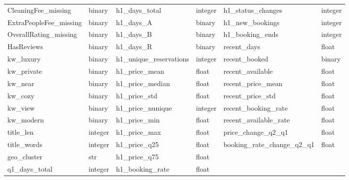 \documentclass[journal]{IEEEtran}
\begin{document}
\begin{table}[!ht]
\begin{tabular}{ll|ll|ll}
CleaningFee\_missing & binary & h1\_days\_total & integer & h1\_status\_changes & integer \\
ExtraPeopleFee\_missing & binary & h1\_days\_A & binary & h1\_new\_bookings & integer \\
OverallRating\_missing & binary & h1\_days\_B & binary & h1\_booking\_ends & integer \\
HasReviews & binary & h1\_days\_R & binary & recent\_days & float \\
kw\_luxury & binary & h1\_unique\_reservations & integer & recent\_booked & binary \\
kw\_private & binary & h1\_price\_mean & float & recent\_available & float \\
kw\_near & binary & h1\_price\_median & float & recent\_price\_mean & float \\
kw\_cozy & binary & h1\_price\_std & float & recent\_price\_std & float \\
kw\_view & binary & h1\_price\_nunique & integer & recent\_booking\_rate & float \\
kw\_modern & binary & h1\_price\_min & float & recent\_available\_rate & float \\
title\_len & integer & h1\_price\_max & float & price\_change\_q2\_q1 & float \\
title\_words & integer & h1\_price\_q25 & float & booking\_rate\_change\_q2\_q1 & float \\
geo\_cluster & str & h1\_price\_q75 & float &  &  \\
q1\_days\_total & integer & h1\_booking\_rate & float &  &  \\
\bottomrule
\end{tabular}
\end{table}
\end{document}
